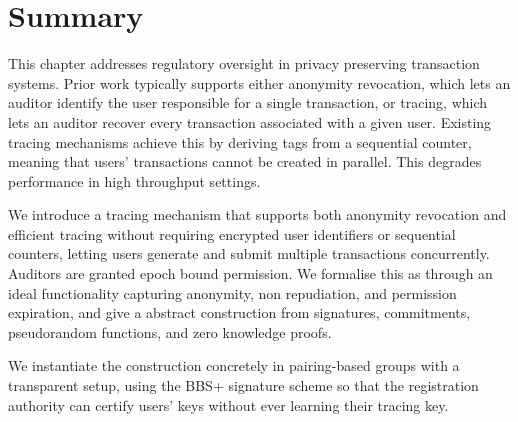 \section{Summary}\label{sec:txid-summary}

This chapter addresses regulatory oversight in privacy preserving transaction
systems. Prior work typically supports either anonymity revocation, which
lets an auditor identify the user responsible for a single transaction, or
tracing, which lets an auditor recover every transaction associated with a
given user. Existing tracing mechanisms achieve this by deriving
tags from a sequential counter, meaning that users'
transactions cannot be created in parallel. This degrades performance in
high throughput settings.
 
We introduce a tracing mechanism that supports both anonymity revocation and
efficient tracing without requiring encrypted user identifiers or sequential
counters, letting users generate and submit multiple transactions
concurrently. Auditors are granted epoch bound
permission. We formalise this as through an ideal functionality
capturing anonymity, non repudiation, and permission expiration, and give a
abstract construction from signatures, commitments, pseudorandom functions,
and zero knowledge proofs.
 
We instantiate the construction concretely in pairing-based groups with a
transparent setup, using the BBS+ signature scheme so that the registration
authority can certify users' keys without ever learning their tracing key.